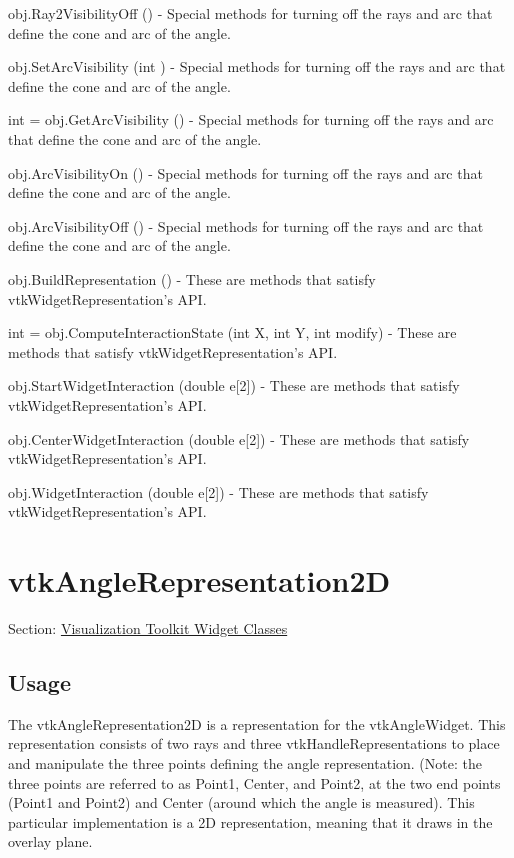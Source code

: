 \begin{DoxyItemize}
\item {\ttfamily obj.\-Ray2\-Visibility\-Off ()} -\/ Special methods for turning off the rays and arc that define the cone and arc of the angle.  
\item {\ttfamily obj.\-Set\-Arc\-Visibility (int )} -\/ Special methods for turning off the rays and arc that define the cone and arc of the angle.  
\item {\ttfamily int = obj.\-Get\-Arc\-Visibility ()} -\/ Special methods for turning off the rays and arc that define the cone and arc of the angle.  
\item {\ttfamily obj.\-Arc\-Visibility\-On ()} -\/ Special methods for turning off the rays and arc that define the cone and arc of the angle.  
\item {\ttfamily obj.\-Arc\-Visibility\-Off ()} -\/ Special methods for turning off the rays and arc that define the cone and arc of the angle.  
\item {\ttfamily obj.\-Build\-Representation ()} -\/ These are methods that satisfy vtk\-Widget\-Representation's A\-P\-I.  
\item {\ttfamily int = obj.\-Compute\-Interaction\-State (int X, int Y, int modify)} -\/ These are methods that satisfy vtk\-Widget\-Representation's A\-P\-I.  
\item {\ttfamily obj.\-Start\-Widget\-Interaction (double e\mbox{[}2\mbox{]})} -\/ These are methods that satisfy vtk\-Widget\-Representation's A\-P\-I.  
\item {\ttfamily obj.\-Center\-Widget\-Interaction (double e\mbox{[}2\mbox{]})} -\/ These are methods that satisfy vtk\-Widget\-Representation's A\-P\-I.  
\item {\ttfamily obj.\-Widget\-Interaction (double e\mbox{[}2\mbox{]})} -\/ These are methods that satisfy vtk\-Widget\-Representation's A\-P\-I.  
\end{DoxyItemize}\hypertarget{vtkwidgets_vtkanglerepresentation2d}{}\section{vtk\-Angle\-Representation2\-D}\label{vtkwidgets_vtkanglerepresentation2d}
Section\-: \hyperlink{sec_vtkwidgets}{Visualization Toolkit Widget Classes} \hypertarget{vtkwidgets_vtkxyplotwidget_Usage}{}\subsection{Usage}\label{vtkwidgets_vtkxyplotwidget_Usage}
The vtk\-Angle\-Representation2\-D is a representation for the vtk\-Angle\-Widget. This representation consists of two rays and three vtk\-Handle\-Representations to place and manipulate the three points defining the angle representation. (Note\-: the three points are referred to as Point1, Center, and Point2, at the two end points (Point1 and Point2) and Center (around which the angle is measured). This particular implementation is a 2\-D representation, meaning that it draws in the overlay plane.

